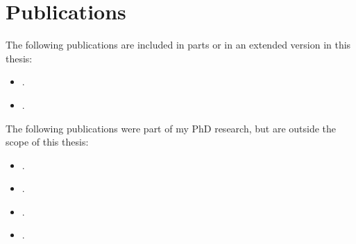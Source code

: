 \chapter*{Publications}

The following publications are included in parts or in an extended version in
this thesis:
\begin{itemize}
    \item {}.
    \item {}.
\end{itemize}

The following publications were part of my PhD research, but are outside the scope of this thesis:
\begin{itemize}
    \item {}.
    \item {}.
    \item {}.
    \item {}.
\end{itemize}

